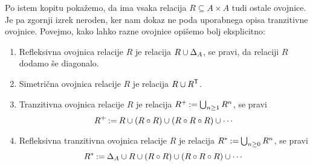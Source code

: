 Po istem kopitu pokažemo, da ima vsaka relacija $R \subseteq A \times A$ tudi ostale
ovojnice. Je pa zgornji izrek neroden, ker nam dokaz ne poda uporabnega opisa
tranzitivne ovojnice. Povejmo, kako lahko razne ovojnice opišemo bolj
eksplicitno:
%
\begin{enumerate}
\item Refleksivna ovojnica relacije $R$ je relacija $R \cup \diag[A]$, se pravi, da
  relaciji $R$ dodamo še diagonalo.
\item 
  Simetrična ovojnica relacije $R$ je relacija $R \cup \transpose{R}$.
\item
  Tranzitivna ovojnica relacije $R$ je relacija $R^{+} \defeq \bigcup_{n \geq 1} R^n$, se pravi
  \begin{equation*}
    R^{+} \defeq R \cup (R \circ R) \cup (R \circ R \circ R) \cup \cdots
  \end{equation*}
\item
  Refleksivna tranzitivna ovojnica relacije $R$ je relacija $R^{*} \defeq \bigcup_{n \geq 0} R^n$, se pravi
  \begin{equation*}
  R^{*} \defeq \diag[A] \cup R \cup (R \circ R) \cup (R \circ R \circ R) \cup \cdots
  \end{equation*}
\end{enumerate}
